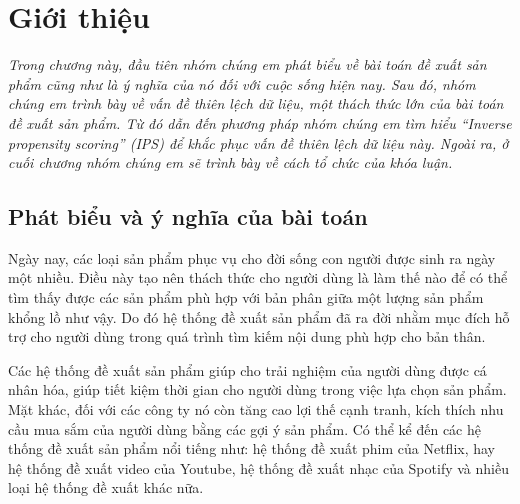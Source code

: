 \chapter{Giới thiệu}
\label{Chapter1}



\noindent \textit{Trong chương này, đầu tiên nhóm chúng em phát biểu về bài toán đề xuất sản phẩm cũng như là ý nghĩa của nó đối với cuộc sống hiện nay. Sau đó, nhóm chúng em trình bày về vấn đề thiên lệch dữ liệu, một thách thức lớn của bài toán đề xuất sản phẩm. Từ đó dẫn đến phương pháp nhóm chúng em tìm hiểu ``Inverse propensity scoring'' (IPS) để khắc phục vấn đề thiên lệch dữ liệu này. Ngoài ra, ở cuối chương nhóm chúng em sẽ trình bày về cách tổ chức của khóa luận.}

\section{Phát biểu và ý nghĩa của bài toán}
Ngày nay, các loại sản phẩm phục vụ cho đời sống con người được sinh ra ngày một nhiều. Điều này tạo nên thách thức cho người dùng là làm thế nào để có thể tìm thấy được các sản phẩm phù hợp với bản phân giữa một lượng sản phẩm khổng lồ như vậy. Do đó hệ thống đề xuất sản phẩm đã ra đời nhằm mục đích hỗ trợ cho người dùng trong quá trình tìm kiếm nội dung phù hợp cho bản thân.

Các hệ thống đề xuất sản phẩm giúp cho trải nghiệm của người dùng được cá nhân hóa, giúp tiết kiệm thời gian cho người dùng trong việc lựa chọn sản phẩm. Mặt khác, đối với các công ty nó còn tăng cao lợi thế cạnh tranh, kích thích nhu cầu mua sắm của người dùng bằng các gợi ý sản phẩm. Có thể kể đến các hệ thống đề xuất sản phẩm nổi tiếng như: hệ thống đề xuất phim của Netflix, hay hệ thống đề xuất video của Youtube, hệ thống đề xuất nhạc của Spotify và nhiều loại hệ thống đề xuất khác nữa.

